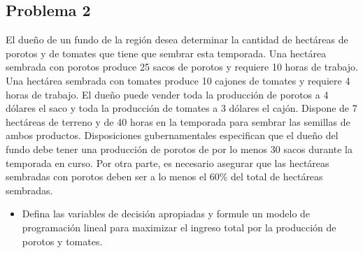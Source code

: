 \documentclass[letterpaper]{article}
\begin{document}
\subsection*{Problema 2}
El dueño de un fundo de la región desea determinar la cantidad de hectáreas de porotos y de tomates que tiene que sembrar esta temporada. Una hectárea sembrada con porotos produce 25 sacos de porotos y requiere 10 horas de trabajo. Una hectárea sembrada con tomates produce 10 cajones de tomates y requiere 4 horas de trabajo. El dueño puede vender toda la producción de porotos a 4 dólares el saco y toda la producción de tomates a 3 dólares el cajón. Dispone de 7 hectáreas de terreno y de 40 horas en la temporada para sembrar las semillas de ambos productos. Disposiciones gubernamentales especifican que el dueño del fundo debe tener una producción de porotos de por lo menos 30 sacos durante la temporada en curso. Por otra parte, es necesario asegurar que las hectáreas sembradas con porotos deben ser a lo menos el 60\% del total de hectáreas sembradas.

\begin{itemize}
\item Defina las variables de decisión apropiadas y formule un modelo de programación lineal para maximizar el ingreso total por la producción de porotos y tomates. 
\end{itemize}
\end{document}
